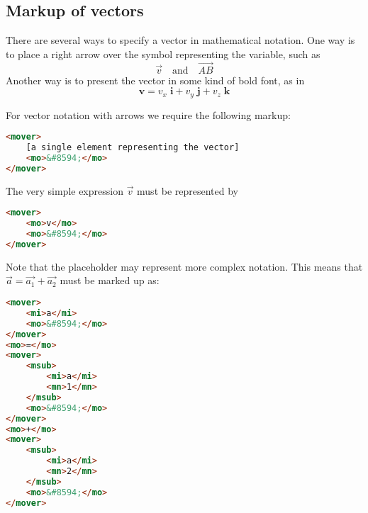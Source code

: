 \documentclass[english,a4paper,11pt]{article}
\begin{document}
\subsection{Markup of vectors}
There are several ways to specify a vector in mathematical notation. One way is to place a right arrow over the symbol representing the variable, such as 
\begin{equation}
\vec{v}\quad \text{and}\quad \overrightarrow{AB}
\end{equation}
Another way is to present the vector in some kind of bold font, as in 
\begin{equation}
\mathbf{v} = v_x\;  \mathbf{i} + v_y\; \mathbf{j} + v_z\;  \mathbf{k}
\end{equation}

\bigskip
For vector notation with arrows we require the following markup:
\begin{lstlisting}[language=HTML]
<mover>
	[a single element representing the vector]
	<mo>&#8594;</mo>
</mover>
\end{lstlisting}

\begin{examples}
The very simple expression $\vec{v}$ must be represented by
\begin{lstlisting}[language=HTML]
<mover>
	<mo>v</mo>
	<mo>&#8594;</mo>
</mover>
\end{lstlisting}
Note that the placeholder  may represent more complex notation. This means that $\vec{a} = \vec{a_1} + \vec{a_2}$ must be marked up as:
\begin{lstlisting}[language=HTML]
<mover>
	<mi>a</mi>
	<mo>&#8594;</mo>
</mover>
<mo>=</mo>
<mover>
	<msub>
		<mi>a</mi>
		<mn>1</mn>
	</msub>
	<mo>&#8594;</mo>
</mover>
<mo>+</mo>
<mover>
	<msub>
		<mi>a</mi>
		<mn>2</mn>
	</msub>
	<mo>&#8594;</mo>
</mover>
\end{lstlisting}
\end{examples}
\end{document}
